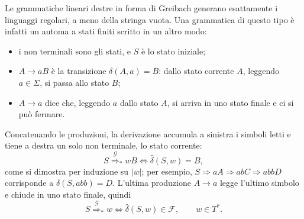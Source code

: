 \documentclass[a4paper, 11pt, oneside]{book}
\theoremstyle{formale}
\begin{document}
    Le grammatiche lineari destre in forma di Greibach generano esattamente i linguaggi
    regolari, a meno della stringa vuota. Una grammatica di questo tipo \`e infatti un
    automa a stati finiti scritto in un altro modo:
    \begin{itemize}
        \item i non terminali sono gli stati, e $S$ \`e lo stato iniziale;
        \item $A \to aB$ \`e la transizione $\delta(A, a) = B$: dallo stato corrente $A$,
            leggendo $a \in \Sigma$, si passa allo stato $B$;
        \item $A \to a$ dice che, leggendo $a$ dallo stato $A$, si arriva in uno stato
            finale e ci si pu\`o fermare.
    \end{itemize}
    Concatenando le produzioni, la derivazione accumula a sinistra i simboli letti e
    tiene a destra un solo non terminale, lo stato corrente:
    \begin{equation*}
        S \overset{\mathcal{G}}{\Rightarrow}_* wB \iff \hat{\delta}(S, w) = B,
    \end{equation*}
    come si dimostra per induzione su $|w|$; per esempio,
    $S \Rightarrow aA \Rightarrow abC \Rightarrow abbD$ corrisponde a
    $\hat{\delta}(S, abb) = D$. L'ultima produzione $A \to a$ legge l'ultimo simbolo e
    chiude in uno stato finale, quindi
    \begin{equation*}
        S \overset{\mathcal{G}}{\Rightarrow}_* w \iff \hat{\delta}(S, w) \in \mathcal{F},
        \qquad w \in T^*.
    \end{equation*}
\end{document}

